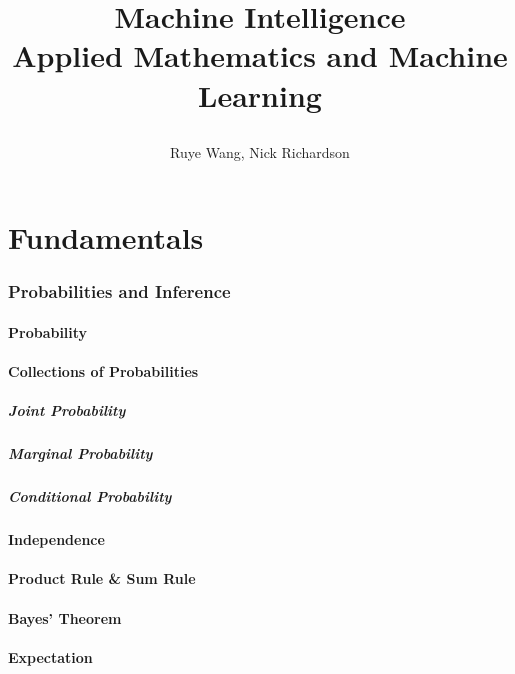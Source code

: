 \documentclass[10pt]{article}
\title{\begin{flushright}{\Large Machine Intelligence}\\{{\Large Applied Mathematics and Machine Learning}}\end{flushright}}
\author{Ruye Wang, Nick Richardson}
\affiliation{
Harvey Mudd College \\
Department of Engineering, Department of Mathematics \\
}
\begin{document}
\maketitle
\flushbottom
\pagestyle{fancynotes}

\part{Fundamentals}

\section{Probabilities and Inference}

\subsection{Probability}

\subsection{Collections of Probabilities}

\subsubsection{Joint Probability}

\subsubsection{Marginal Probability}

\subsubsection{Conditional Probability}

\subsection{Independence}

\subsection{Product Rule \& Sum Rule}

\subsection{Bayes' Theorem}

\subsection{Expectation}
\end{document}
